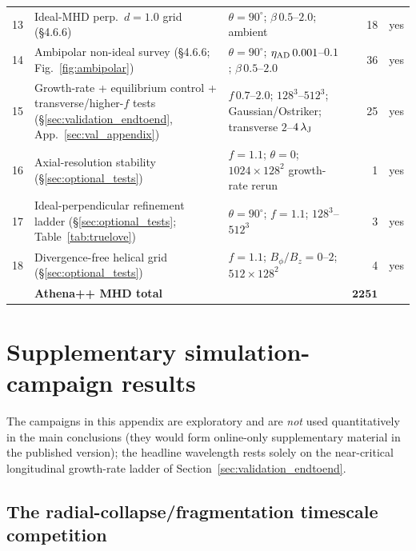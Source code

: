 \documentclass[usenatbib,twoside,twocolumn]{mnras}
\begin{document}
\begin{table}
\begin{tabular}{cllrl}
13 & Ideal-MHD perp.\ $d=1.0$ grid (\S4.6.6) & $\theta=90^\circ$; $\beta\,0.5$--$2.0$; ambient & 18 & yes \\
14 & Ambipolar non-ideal survey (\S4.6.6; Fig.~\ref{fig:ambipolar}) & $\theta=90^\circ$; $\eta_{\rm AD}\,0.001$--$0.1$; $\beta\,0.5$--$2.0$ & 36 & yes \\
15 & Growth-rate + equilibrium control + transverse/higher-$f$ tests (\S\ref{sec:validation_endtoend}, App.~\ref{sec:val_appendix}) & $f\,0.7$--$2.0$; $128^3$--$512^3$; Gaussian/Ostriker; transverse $2$--$4\,\lambda_{\rm J}$ & 25 & yes \\
16 & Axial-resolution stability (\S\ref{sec:optional_tests}) & $f=1.1$; $\theta=0$; $1024\times128^2$ growth-rate rerun & 1 & yes \\
17 & Ideal-perpendicular refinement ladder (\S\ref{sec:optional_tests}; Table~\ref{tab:truelove}) & $\theta=90^\circ$; $f=1.1$; $128^3$--$512^3$ & 3 & yes \\
18 & Divergence-free helical grid (\S\ref{sec:optional_tests}) & $f=1.1$; $B_\phi/B_z=0$--$2$; $512\times128^2$ & 4 & yes \\
\midrule
   & \textbf{Athena++ MHD total} & & $\boldsymbol{2251}$ & \\
\bottomrule
\end{tabular}
\end{table}


\section{Supplementary simulation-campaign results}
\label{sec:supplementary_campaigns_app}

The campaigns in this appendix are exploratory and are \emph{not} used quantitatively in the main conclusions (they would form online-only supplementary material in the published version); the headline wavelength rests solely on the near-critical longitudinal growth-rate ladder of Section~\ref{sec:validation_endtoend}.

\subsection{The radial-collapse/fragmentation timescale competition}
\label{sec:regimes}
\end{document}
